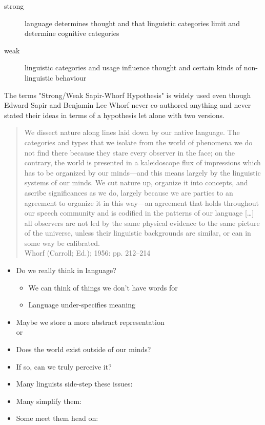 \documentclass[headrule,footrule]{foils}
\begin{document}
\begin{description}
\item[strong]  language determines thought and that linguistic categories limit and determine cognitive categories
\item[weak]  linguistic categories and usage influence thought and certain kinds of non-linguistic behaviour
\end{description}

The terms "Strong/Weak Sapir-Whorf Hypothesis" is widely used even though Edward
Sapir and Benjamin Lee Whorf never co-authored anything and never
stated their ideas in terms of a hypothesis let alone with two versions.

\begin{quotation}
  We dissect nature along lines laid down by our native language. The
  categories and types that we isolate from the world of phenomena we
  do not find there because they stare every observer in the face; on
  the contrary, the world is presented in a kaleidoscope flux of
  impressions which has to be organized by our minds—and this means
  largely by the linguistic systems of our minds. We cut nature up,
  organize it into concepts, and ascribe significances as we do,
  largely because we are parties to an agreement to organize it in
  this way—an agreement that holds throughout our speech community and
  is codified in the patterns of our language [\ldots] all observers
  are not led by the same physical evidence to the same picture of the
  universe, unless their linguistic backgrounds are similar, or can in
  some way be calibrated.
\\ \hfill Whorf (Carroll; Ed.); 1956: pp. 212–214
\end{quotation}



\begin{itemize}\addtolength{\itemsep}{-1ex}
\item Do we really think in language? 
  \begin{itemize}
  \item We can think of things we don't have words for
  \item Language under-specifies meaning
  \end{itemize}
\item Maybe we store a more abstract representation
\\  or 
\item Does the world exist outside of our minds?
\item If so, can we truly perceive it?
\item Many linguists side-step these issues: 
\item Many simplify them: 
\item Some meet them head on: 
\end{itemize}
\end{document}
